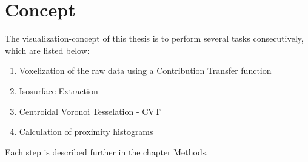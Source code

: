 \chapter{Concept}
\label{concept}

The visualization-concept of this thesis is to perform several tasks consecutively, which are listed below:

\begin{enumerate}

	\item Voxelization of the raw data using a Contribution Transfer function
	\item Isosurface Extraction
	\item Centroidal Voronoi Tesselation - CVT
	\item Calculation of proximity histograms
	
\end{enumerate}

Each step is described further in the chapter Methods.
